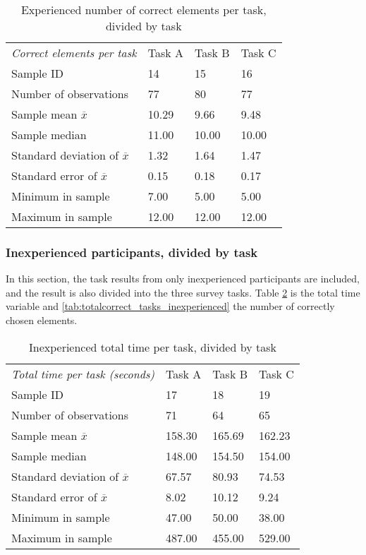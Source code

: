 \begin{table}[H]
	\centering
	\begin{tabular}{l|l|l|l}
		\textit{Correct elements per task} & Task A & Task B & Task C \\ 
		Sample ID & 14 & 15  & 16   \\ \hline
		Number of observations & 77    & 80      &  77  \\
		Sample mean $\overline{x}$ & 10.29  &  9.66  &  9.48   \\
		Sample median & 11.00  &  10.00  &  10.00  \\
		Standard deviation of $\overline{x}$ & 1.32  & 1.64  & 1.47   \\
		Standard error of $\overline{x}$ & 0.15  & 0.18  & 0.17   \\
		Minimum in sample & 7.00 & 5.00 &  5.00 \\
		Maximum in sample  & 12.00 & 12.00  & 12.00 \\ \hline
	\end{tabular}
	\caption[Correct elements, divided by task, only inexperienced]{Experienced number of correct elements per task, divided by task}
	\label{tab:totalcorrect_tasks_experienced}
\end{table}

\subsubsection{Inexperienced participants, divided by task}\label{sec:taskdivided_inexperienced}
In this section, the task results from only inexperienced participants are included, and the result is also divided into the three survey tasks. 
Table \ref{tab:totaltime_tasks_inexperienced} is the total time variable and \ref{tab:totalcorrect_tasks_inexperienced} the number of correctly chosen elements. 

\begin{table}[H]
	\centering
	\begin{tabular}{l|l|l|l}
		\textit{Total time per task (seconds)} & Task A & Task B & Task C \\ 
		Sample ID & 17 & 18 & 19 \\ \hline
		Number of observations & 71    & 64  & 65   \\
		Sample mean $\overline{x}$  & 158.30  &  165.69  &  162.23  \\
		Sample median & 148.00  &  154.50  &  154.00  \\
		Standard deviation of $\overline{x}$  & 67.57 & 80.93 & 74.53  \\
		Standard error of $\overline{x}$  & 8.02  & 10.12 & 9.24  \\
		Minimum in sample & 47.00 & 50.00 &  38.00 \\
		Maximum in sample & 487.00 & 455.00  & 529.00  \\ \hline
	\end{tabular}
	\caption[Total time, inexperienced per task]{Inexperienced total time per task, divided by task}
	\label{tab:totaltime_tasks_inexperienced}
\end{table}

